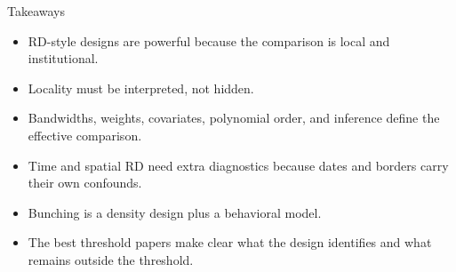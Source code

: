 \documentclass[aspectratio=169,11pt]{beamer}
\newcommand{\1}{\mathbf{1}}
\begin{document}
\begin{frame}{Takeaways}
\begin{itemize}
    \item RD-style designs are powerful because the comparison is local and institutional.
    \item Locality must be interpreted, not hidden.
    \item Bandwidths, weights, covariates, polynomial order, and inference define the effective comparison.
    \item Time and spatial RD need extra diagnostics because dates and borders carry their own confounds.
    \item Bunching is a density design plus a behavioral model.
    \item The best threshold papers make clear what the design identifies and what remains outside the threshold.
\end{itemize}
\end{frame}
\end{document}
